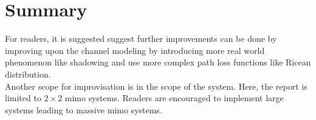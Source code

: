 \section*{Summary}
For readers, it is suggested suggest further improvements can be done by improving upon the channel modeling by introducing more real world phenomenon like shadowing and use more complex path loss functions like Ricean distribution.\\
Another scope for improvisation is in the scope of the system. Here, the report is limited to $2 \times 2$ \acrshort{mimo} systems. Readers are encouraged to implement large systems leading to massive \acrshort{mimo} systems.\\


